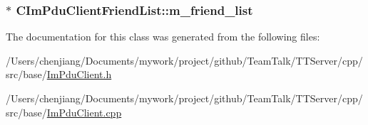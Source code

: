 \subsubsection[{m\+\_\+friend\+\_\+list}]{$\ast$ C\+Im\+Pdu\+Client\+Friend\+List\+::m\+\_\+friend\+\_\+list\hspace{0.3cm}{\ttfamily [private]}}\label{class_c_im_pdu_client_friend_list_aefa7a748d24b2ecbc9b7f6eafcb18eb1}


The documentation for this class was generated from the following files\+:\begin{DoxyCompactItemize}
\item 
/\+Users/chenjiang/\+Documents/mywork/project/github/\+Team\+Talk/\+T\+T\+Server/cpp/src/base/\hyperlink{_im_pdu_client_8h}{Im\+Pdu\+Client.\+h}\item 
/\+Users/chenjiang/\+Documents/mywork/project/github/\+Team\+Talk/\+T\+T\+Server/cpp/src/base/\hyperlink{_im_pdu_client_8cpp}{Im\+Pdu\+Client.\+cpp}\end{DoxyCompactItemize}
